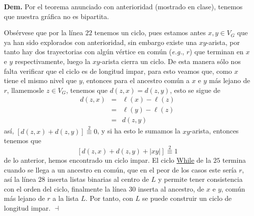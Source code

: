 \documentclass{article}
\begin{document}
\textbf{Dem.} Por el teorema anunciado con anterioridad (mostrado en clase), tenemos
que nuestra gr\'afica no es bipartita.

Obs\'ervese que por la l\'inea $22$ tenemos un ciclo, pues estamos antes $x,y \in V_G$
que ya han sido explorados con anterioridad, sin embargo existe una $xy$-arista, por
tanto hay dos trayectorias con alg\'un v\'ertice en com\'un (\textit{e.g.}, $r$) que terminan
en $x$ e $y$ respectivamente, luego la $xy$-arista cierra un ciclo. De esta manera s\'olo
nos falta verificar que el ciclo es de longitud impar, para esto veamos que, como $x$ tiene
el mismo nivel que $y$, entonces para el ancestro com\'un a $x$ e $y$ m\'as lejano de $r$,
llamemosle $z \in V_G$, tenemos que $d(z,x) = d(z,y)$, esto se sigue de
\begin{eqnarray*}
  d(z,x) &=& \ell(x) - \ell(z)\\
  &=& \ell(y) - \ell(z)\\
  &=& d(z,y)
\end{eqnarray*}
as\'i, $[d(z,x) + d(z,y)] \stackrel{2}{\equiv}0$, y si ha esto le sumamos la $xy$-arista,
entonces tenemos que
\[
[d(z,x) + d(z,y) + |xy|] \stackrel{2}{\equiv}1
\]
de lo anterior, hemos encontrado un ciclo impar. El ciclo \underline{While} de la $25$
termina cuando se llega a un ancestro en com\'un, que en el peor de los casos este ser\'ia
$r$, as\'i la l\'inea $28$ inserta listas binarias al centro de $L$ y permite tener consistencia
con el orden del ciclo, finalmente la l\'inea $30$ inserta al ancestro, de $x$ e $y$, com\'un
m\'as lejano de $r$ a la lista $L$. Por tanto, con $L$ se puede construir un ciclo de
longitud impar.
\hfill $\dashv$
\end{document}
